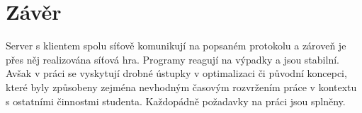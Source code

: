 \documentclass[12pt, a4paper]{article} %
\begin{document}
	\section{Závěr}
	\par Server s klientem spolu síťově komunikují na popsaném protokolu a zároveň je přes něj realizována síťová hra. Programy reagují na výpadky a jsou stabilní. Avšak v práci se vyskytují drobné ústupky v optimalizaci či původní koncepci, které byly způsobeny zejména nevhodným časovým rozvržením práce v kontextu s ostatními činnostmi studenta. Každopádně požadavky na práci jsou splněny.
	
\end{document}
